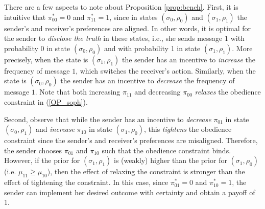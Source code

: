 \documentclass[12pt,english]{article}
\theoremstyle{plain}
\begin{document}
There are a few aspects to note about Proposition \ref{prop:bench}. 
First, it is intuitive that $\pi^*_{00}=0$ and $\pi^*_{11}=1$, since in states $(\sigma_0,\rho_0)$ and $(\sigma_1,\rho_1)$ the sender's and receiver's preferences are aligned.
In other words, it is optimal for the sender to \emph{disclose the truth} in these states, i.e., she sends message $1$ with probability 0 in state $(\sigma_0,\rho_0)$ and with probability 1 in state $(\sigma_1,\rho_1)$.
More precisely, when the state is $(\sigma_1,\rho_1)$ the sender has an incentive to \emph{increase} the frequency of message $1$, which switches the receiver's action. 
Similarly, when the state is $(\sigma_0,\rho_0)$ the sender has an incentive to \emph{decrease} the frequency of message $1$.
Note that both increasing $\pi_{11}$ and decreasing $\pi_{00}$ \emph{relaxes} the obedience constraint in (\ref{OP_soph}). 

Second, observe that while the sender has an incentive to \emph{decrease} $\pi_{01}$ in state $(\sigma_0,\rho_1)$ and \emph{increase} $\pi_{10}$ in state $(\sigma_1,\rho_0)$, this \emph{tightens} the obedience constraint since the sender's and receiver's preferences are misaligned. 
Therefore, the sender chooses $\pi_{01}$ and $\pi_{10}$ such that the obedience constraint binds. 
However, if the prior for $(\sigma_1,\rho_1)$ is (weakly) higher than the prior for $(\sigma_1,\rho_0)$ (i.e. $\mu_{11}\geq\mu_{10}$), then the effect of relaxing the constraint is stronger than the effect of tightening the constraint.
In this case, since $\pi^*_{01}=0$ and $\pi^*_{10}=1$, the sender can implement her desired outcome with certainty and obtain a payoff of 1. 
\end{document}
